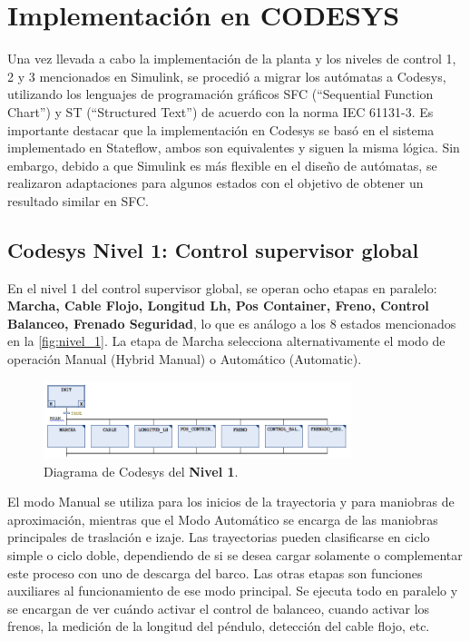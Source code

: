 \documentclass[11pt]{article}
\begin{document}
\newpage

\section{Implementación en CODESYS}

Una vez llevada a cabo la implementación de la planta y los niveles de control 1, 2 y 3 mencionados en Simulink, se procedió a migrar los autómatas a Codesys, utilizando los lenguajes de programación gráficos SFC (``Sequential Function Chart'') y ST (``Structured Text'') de acuerdo con la norma IEC 61131-3. Es importante destacar que la implementación en Codesys se basó en el sistema implementado en Stateflow, ambos son equivalentes y siguen la misma lógica. Sin embargo, debido a que Simulink es más flexible en el diseño de autómatas, se realizaron adaptaciones para algunos estados con el objetivo de obtener un resultado similar en SFC.

\subsection{Codesys Nivel 1: Control supervisor global}

En el nivel 1 del control supervisor global, se operan ocho etapas en paralelo: \textbf{Marcha, Cable Flojo, Longitud Lh, Pos Container, Freno, Control Balanceo, Frenado Seguridad}, lo que es análogo a los 8 estados mencionados en la \ref{fig:nivel_1}. La etapa de Marcha selecciona alternativamente el modo de operación Manual (Hybrid Manual) o Automático (Automatic).

\begin{figure}[!h]
	\centering
	\includegraphics[width=0.8\textwidth]{images/codesys_nivel_1.png}
	\caption{Diagrama de Codesys del \textbf{Nivel 1}.}
	\label{fig:codesys_nivel_1}
\end{figure}

El modo Manual se utiliza para los inicios de la trayectoria y para maniobras de aproximación, mientras que el Modo Automático se encarga de las maniobras principales de traslación e izaje. Las trayectorias pueden clasificarse en ciclo simple o ciclo doble, dependiendo de si se desea cargar solamente o complementar este proceso con uno de descarga del barco. Las otras etapas son funciones auxiliares al funcionamiento de ese modo principal. Se ejecuta todo en paralelo y se encargan de ver cuándo activar el control de balanceo, cuando activar los frenos, la medición de la longitud del péndulo, detección del cable flojo, etc.
\end{document}
